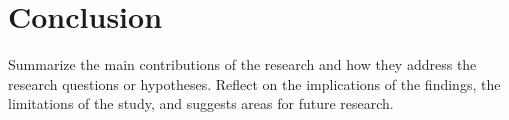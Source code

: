 \chapter{Conclusion}
\label{ch:conclusion}

Summarize the main contributions of the research and how
they address the research questions or hypotheses.
Reflect on the implications of the findings, the limitations of the study,
and suggests areas for future research.
